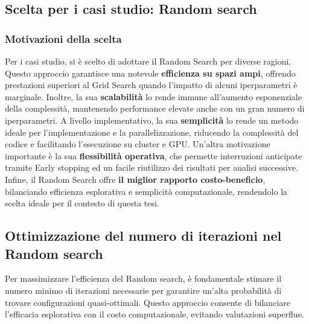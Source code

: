 \documentclass[a4paper,12pt]{report}
\begin{document}
	\subsection{Scelta per i casi studio: Random search}
	
	\subsubsection{Motivazioni della scelta}
	Per i casi studio, si è scelto di adottare il Random Search per diverse ragioni. Questo approccio garantisce una notevole \textbf{efficienza su spazi ampi}, offrendo prestazioni superiori al Grid Search quando l'impatto di alcuni iperparametri è marginale. Inoltre, la sua \textbf{scalabilità} lo rende immune all'aumento esponenziale della complessità, mantenendo performance elevate anche con un gran numero di iperparametri. A livello implementativo, la sua \textbf{semplicità} lo rende un metodo ideale per l'implementazione e la parallelizzazione, riducendo la complessità del codice e facilitando l'esecuzione su cluster e GPU. Un'altra motivazione importante è la sua \textbf{flessibilità operativa}, che permette interruzioni anticipate tramite Early stopping ed un facile riutilizzo dei risultati per analisi successive. Infine, il Random Search offre \textbf{il miglior rapporto costo-beneficio}, bilanciando efficienza esplorativa e semplicità computazionale, rendendolo la scelta ideale per il contesto di questa tesi.
	
	\subsection{Ottimizzazione del numero di iterazioni nel Random search}
	Per massimizzare l'efficienza del Random search, è fondamentale stimare il numero minimo di iterazioni necessarie per garantire un'alta probabilità di trovare configurazioni quasi-ottimali. Questo approccio consente di bilanciare l'efficacia esplorativa con il costo computazionale, evitando valutazioni superflue.
	
\end{document}

